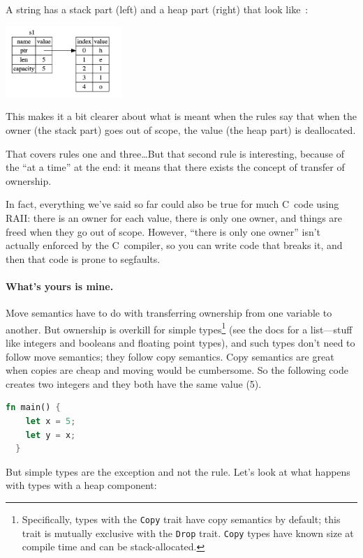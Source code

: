 \documentclass[a4paper]{report}
\newcommand{\CPP}{C\nolinebreak\hspace{-.05em}\raisebox{.4ex}{\tiny\bf +}\nolinebreak\hspace{-.10em}\raisebox{.4ex}{\tiny\bf +}}
\def\CPP{{C\nolinebreak[4]\hspace{-.05em}\raisebox{.4ex}{\tiny\bf ++}}}
\begin{document}
A string has a stack part (left) and a heap part (right) that look like~\cite{rustdocs}:
\begin{center}
\includegraphics[width=0.33\textwidth]{images/string.png} 
\end{center}

This makes it a bit clearer about what is meant when the rules say that when the owner (the stack part) goes out of scope, the value (the heap part) is deallocated.

That covers rules one and three\ldots But that second rule is interesting, because of the ``at a time'' at the end: it means that there exists the concept of transfer of ownership.

In fact, everything we've said so far could also be true for much \CPP~code using RAII: there is an owner for each value, there is only one owner, and things are freed when they go out of scope. However, ``there is only one owner'' isn't actually enforced by the \CPP~compiler, so you can write code that breaks it, and then that code is prone to segfaults. 

\paragraph{What's yours is mine.}
Move semantics have to do with transferring ownership from one variable to another. But ownership is overkill for simple types\footnote{Specifically, types with the \texttt{Copy} trait have copy semantics by default; this trait is mutually exclusive with the \texttt{Drop} trait. \texttt{Copy} types have known size at compile time and can be stack-allocated.} (see the docs for a list---stuff like integers and booleans and floating point types), and such types don't need to follow move semantics; they follow copy semantics. Copy semantics are great when copies are cheap and moving would be cumbersome. So the following code creates two integers and they both have the same value (5).

\begin{lstlisting}[language=Rust]
  fn main() {
   	let x = 5;
	let y = x;
  }
\end{lstlisting}

But simple types are the exception and not the rule. Let's look at what happens with types with a heap component:
\end{document}
